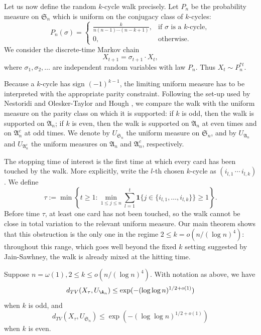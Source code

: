 Let us now define the random $k$-cycle walk precisely. Let $P_n$ be the
probability measure on $\mathfrak S_n$ which is uniform on the conjugacy class
of $k$-cycles:
\begin{equation}\label{eq: measure of k-cycle}
P_n(\sigma)=
\begin{cases}
\frac{k}{n(n-1)\cdots(n-k+1)}, & \text{if } \sigma \text{ is a } k\text{-cycle},\\
0, & \text{otherwise}.
\end{cases}
\end{equation}
We consider the discrete-time Markov chain
$$
X_{t+1}=\sigma_{t+1}\cdot X_t,
$$
where $\sigma_1,\sigma_2,\ldots$ are independent random variables with law
$P_n$. Thus $X_t\sim P_n^{*t}$.

Because a $k$-cycle has sign $(-1)^{k-1}$, the limiting uniform measure has
to be interpreted with the appropriate parity constraint. Following the set-up
used by Nestoridi and Olesker-Taylor \cite{nestoridi2022limit} and Hough
\cite{hough2016random}, we compare the walk with the uniform measure on the
parity class on which it is supported: if $k$ is odd, then the walk is
supported on $\mathfrak A_n$; if $k$ is even, then the walk is supported on
$\mathfrak A_n$ at even times and on $\mathfrak A_n^c$ at odd times. We
denote by $U_{\mathfrak S_n}$ the uniform measure on $\mathfrak S_n$, and by
$U_{\mathfrak A_n}$ and $U_{\mathfrak A_n^c}$ the uniform measures on
$\mathfrak A_n$ and $\mathfrak A_n^c$, respectively.

The stopping time of interest is the first time at which every card has been
touched by the walk. More explicitly, write the $l$-th chosen $k$-cycle as
$(i_{l,1}\,\cdots\, i_{l,k})$. We define
\begin{equation}\label{eq: hitting time}
\tau
:=
\min\left\{
t\ge 1:
\min_{1\le j\le n}
\sum_{l=1}^t
\mathbf 1\{j\in\{i_{l,1},\ldots,i_{l,k}\}\}
\ge 1
\right\}.
\end{equation}
Before time $\tau$, at least one card has not been touched, so the walk cannot
be close in total variation to the relevant uniform measure. Our main theorem
shows that this obstruction is the only one in the regime
$2\le k=o(n/(\log n)^4)$: throughout this range, which goes well beyond the
fixed $k$ setting suggested by Jain-Sawhney, the walk is already mixed at the
hitting time. 

\begin{thm}\label{thm: hitting time mixing_main thm}
Suppose $n=\omega(1),2\le k\le o(n/(\log n)^{4})$. With notation as above, we have 
$$d_{TV}(X_\tau,U_{\A_n})\le \exp(-(\log\log n)^{1/2+o(1)})$$
when $k$ is odd, and
$$d_{TV}(X_\tau,U_{\mathfrak{S}_n})\le\exp(-(\log\log n)^{1/2+o(1)})$$
when $k$ is even. 
\end{thm}

